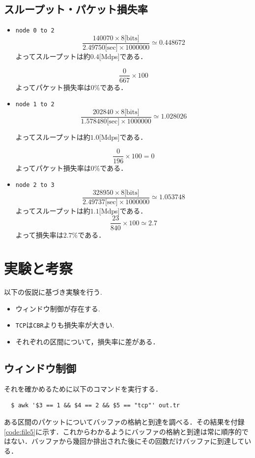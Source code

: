 \documentclass[paper=a4, fontsize=10pt]{jlreq}
\begin{document}
\subsection{スループット・パケット損失率}
\label{throw_and_loss}
\begin{itemize}
  \item \texttt{node 0 to 2}
    \[
      \frac{140070 \times 8 \text{[bits]}}{2.49750 \text{[sec]} \times 1000000} \simeq 0.448672
    \]
    よってスループットは約$0.4$[Mdps]である．

    \[
      \frac{0}{667} \times 100
    \]
    よってパケット損失率は$0 \%$である．

  \item \texttt{node 1 to 2}
    \[
      \frac{202840 \times 8 \text{[bits]}}{1.578480 \text{[sec]} \times 1000000} \simeq 1.028026
    \]

    よってスループットは約$1.0$[Mdps]である．

    \[
      \frac{0}{196} \times 100 = 0
    \]
    よってパケット損失率は$0 \%$である．
  \item \texttt{node 2 to 3}
    \[
      \frac{328950 \times 8 \text{[bits]}}{2.49737 \text{[sec]} \times 1000000} \simeq 1.053748
    \]
    よってスループットは約$1.1$[Mdps]である．
    \[
      \frac{23}{840} \times 100 \simeq 2.7
    \]
    よって損失率は$2.7 \%$である．
\end{itemize}

\section{実験と考察}
以下の仮説に基づき実験を行う.
\begin{itemize}
  \item ウィンドウ制御が存在する.
  \item \texttt{TCP}は\texttt{CBR}よりも損失率が大きい.
  \item それぞれの区間について，損失率に差がある．
\end{itemize}

\subsection{ウィンドウ制御}
それを確かめるために以下のコマンドを実行する．
\begin{lstlisting}
  $ awk '$3 == 1 && $4 == 2 && $5 == "tcp"' out.tr
\end{lstlisting}

ある区間のパケットについてバッファの格納と到達を調べる．その結果を付録\ref{code:file5}に示す．これからわかるようにバッファの格納と到達は常に順序的ではない．バッファから幾回か排出された後にその回数だけバッファに到達している．
\end{document}
